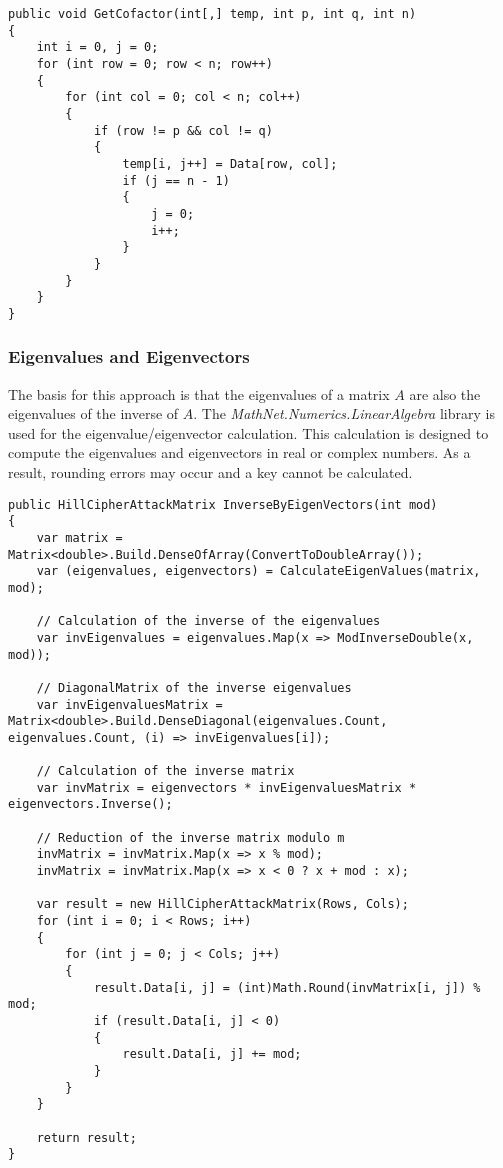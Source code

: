 \documentclass[conference]{IEEEtran}
\begin{document}
\begin{lstlisting}[caption={GetCofactor method}, label={lst:calcCofa}]
public void GetCofactor(int[,] temp, int p, int q, int n)
{
    int i = 0, j = 0;
    for (int row = 0; row < n; row++)
    {
        for (int col = 0; col < n; col++)
        {
            if (row != p && col != q)
            {
                temp[i, j++] = Data[row, col];
                if (j == n - 1)
                {
                    j = 0;
                    i++;
                }
            }
        }
    }
}
\end{lstlisting}

\subsubsection{Eigenvalues and Eigenvectors}
The basis for this approach is that the eigenvalues of a matrix \(A\) are also the eigenvalues of the inverse of \(A\). The \textit{MathNet.Numerics.LinearAlgebra} library is used for the eigenvalue/eigenvector calculation. This calculation is designed to compute the eigenvalues and eigenvectors in real or complex numbers. As a result, rounding errors may occur and a key cannot be calculated.
\\

\begin{lstlisting}[caption={InverseByEigenVectors method}, label={lst:calcInverseEigenVec}]
public HillCipherAttackMatrix InverseByEigenVectors(int mod)
{
    var matrix = Matrix<double>.Build.DenseOfArray(ConvertToDoubleArray());
    var (eigenvalues, eigenvectors) = CalculateEigenValues(matrix, mod);

    // Calculation of the inverse of the eigenvalues
    var invEigenvalues = eigenvalues.Map(x => ModInverseDouble(x, mod));

    // DiagonalMatrix of the inverse eigenvalues
    var invEigenvaluesMatrix = Matrix<double>.Build.DenseDiagonal(eigenvalues.Count, eigenvalues.Count, (i) => invEigenvalues[i]);

    // Calculation of the inverse matrix
    var invMatrix = eigenvectors * invEigenvaluesMatrix * eigenvectors.Inverse();

    // Reduction of the inverse matrix modulo m
    invMatrix = invMatrix.Map(x => x % mod);
    invMatrix = invMatrix.Map(x => x < 0 ? x + mod : x);

    var result = new HillCipherAttackMatrix(Rows, Cols);
    for (int i = 0; i < Rows; i++)
    {
        for (int j = 0; j < Cols; j++)
        {
            result.Data[i, j] = (int)Math.Round(invMatrix[i, j]) % mod;
            if (result.Data[i, j] < 0)
            {
                result.Data[i, j] += mod;
            }
        }
    }

    return result;
}
\end{lstlisting}
\end{document}
